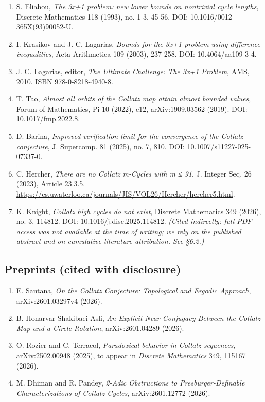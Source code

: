 \documentclass[
  11pt]{amsart}
\providecommand{\tightlist}{%
  \setlength{\itemsep}{0pt}\setlength{\parskip}{0pt}}
\theoremstyle{plain}
\theoremstyle{definition}
\theoremstyle{remark}
\begin{document}
\begin{enumerate}
  J. L. Simons and B. M. M. de Weger, \emph{Theoretical and
  computational bounds for m-cycles of the 3n+1 problem}, Acta
  Arithmetica 117 (2005), 51-70. DOI: 10.4064/aa117-1-3.
\item
  S. Eliahou, \emph{The 3x+1 problem: new lower bounds on nontrivial
  cycle lengths}, Discrete Mathematics 118 (1993), no. 1-3, 45-56. DOI:
  10.1016/0012-365X(93)90052-U.
\item
  I. Krasikov and J. C. Lagarias, \emph{Bounds for the 3x+1 problem
  using difference inequalities}, Acta Arithmetica 109 (2003), 237-258.
  DOI: 10.4064/aa109-3-4.
\item
  J. C. Lagarias, editor, \emph{The Ultimate Challenge: The 3x+1
  Problem}, AMS, 2010. ISBN 978-0-8218-4940-8.
\item
  T. Tao, \emph{Almost all orbits of the Collatz map attain almost
  bounded values}, Forum of Mathematics, Pi 10 (2022), e12,
  arXiv:1909.03562 (2019). DOI: 10.1017/fmp.2022.8.
\item
  D. Barina, \emph{Improved verification limit for the convergence of
  the Collatz conjecture}, J. Supercomp. 81 (2025), no. 7, 810. DOI:
  10.1007/s11227-025-07337-0.
\item
  C. Hercher, \emph{There are no Collatz m-Cycles with m ≤ 91}, J.
  Integer Seq. 26 (2023), Article 23.3.5.
  \url{https://cs.uwaterloo.ca/journals/JIS/VOL26/Hercher/hercher5.html}.
\item
  K. Knight, \emph{Collatz high cycles do not exist}, Discrete
  Mathematics 349 (2026), no. 3, 114812. DOI:
  10.1016/j.disc.2025.114812. \emph{(Cited indirectly: full PDF access
  was not available at the time of writing; we rely on the published
  abstract and on cumulative-literature attribution. See §6.2.)}
\end{enumerate}

\subsection*{Preprints (cited with
disclosure)}\label{preprints-cited-with-disclosure}

\begin{enumerate}
\def\labelenumi{\arabic{enumi}.}
\setcounter{enumi}{19}
\tightlist
\item
  E. Santana, \emph{On the Collatz Conjecture: Topological and Ergodic
  Approach}, arXiv:2601.03297v4 (2026).
\item
  B. Honarvar Shakibaei Asli, \emph{An Explicit Near-Conjugacy Between
  the Collatz Map and a Circle Rotation}, arXiv:2601.04289 (2026).
\item
  O. Rozier and C. Terracol, \emph{Paradoxical behavior in Collatz
  sequences}, arXiv:2502.00948 (2025), to appear in \emph{Discrete
  Mathematics} 349, 115167 (2026).
\item
  M. Dhiman and R. Pandey, \emph{2-Adic Obstructions to
  Presburger-Definable Characterizations of Collatz Cycles},
  arXiv:2601.12772 (2026).
\end{enumerate}
\end{document}
